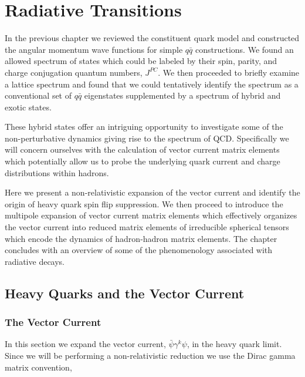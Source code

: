 \chapter{Radiative Transitions} \label{chap::radTranQM}

In the previous chapter we reviewed the constituent quark model and constructed the angular momentum wave functions for simple $q\bar{q}$ constructions. We found an allowed spectrum of states which could be labeled by their spin, parity, and charge conjugation quantum numbers, $J^{PC}$. We then proceeded to briefly examine a lattice spectrum and found that we could tentatively identify the spectrum as a conventional set of $q\bar{q}$ eigenstates supplemented by a spectrum of hybrid and exotic states. 

These hybrid states offer an intriguing opportunity to investigate some of the non-perturbative dynamics giving rise to the spectrum of QCD. Specifically we will concern ourselves with the calculation of vector current matrix elements which potentially allow us to probe the underlying quark current and charge distributions within hadrons. 

Here we present a non-relativistic expansion of the vector current and identify the origin of heavy quark spin flip suppression. We then proceed to introduce the multipole expansion of vector current matrix elements which effectively organizes the vector current into reduced matrix elements of irreducible spherical tensors which encode the dynamics of hadron-hadron matrix elements. The chapter concludes with an overview of some of the phenomenology associated with radiative decays. 


\section{Heavy Quarks and the Vector Current} \label {QM::HQ}
\subsection{The Vector Current}
In this section we expand the vector current, $\bar{\psi}\gamma^k\psi$, in the heavy quark limit. Since we will be performing a non-relativistic reduction we use the Dirac gamma matrix convention,

